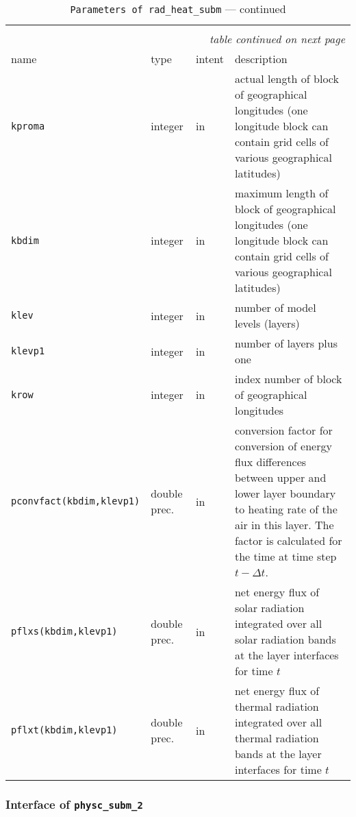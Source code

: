 \begin{longtable}{l@{\extracolsep\fill}llp{7.0cm}}
\hline\hline\caption[Parameters of {\tt rad\_heat\_subm}]{Parameter list
  of arguments passed to {\tt rad\_heat\_subm}}\\\hline\label{tabrad_heat_subm}
\endfirsthead
\caption[]{{\tt Parameters of {\tt rad\_heat\_subm}} --- continued}\\\hline
\endhead
\hline\multicolumn{4}{r}{\slshape table continued on next page}\\
\endfoot
\hline %
\endlastfoot
name & type & intent & description \\\hline
{\tt kproma} & integer & in & actual length of
block of geographical longitudes (one longitude block can contain grid
cells of various geographical latitudes)\\
{\tt kbdim} &  integer & in & maximum length of block of
geographical longitudes (one longitude block can contain grid cells of
various geographical latitudes)\\
{\tt klev} &  integer & in & number of model levels (layers)\\
{\tt klevp1} &  integer & in & number of layers plus one \\
{\tt krow} &  integer & in & index number of block of geographical
longitudes\\ 
{\tt pconvfact(kbdim,klevp1)} & double prec. & in & conversion factor
for conversion of energy flux differences between upper and lower
layer boundary to heating rate of the air in this layer. The factor is
calculated for the time at time step $t-\Delta t$.\\
{\tt pflxs(kbdim,klevp1)} & double prec. & in & net energy flux of solar
radiation integrated over all solar radiation bands at the layer
interfaces for time $t$\\
{\tt pflxt(kbdim,klevp1)} & double prec. & in & net energy flux of thermal
radiation integrated over all thermal radiation bands at the layer
interfaces for time $t$\\
\end{longtable}

\subsubsection{Interface of {\tt physc\_subm\_2}}

